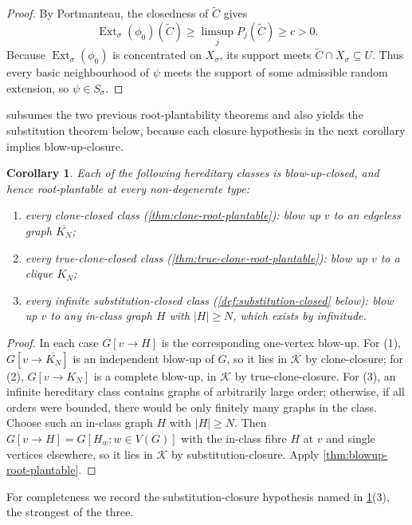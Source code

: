 \documentclass[11pt]{article}
\newtheorem{corollary}[corollary]{Corollary}
\theoremstyle{definition}
\newcommand{\K}{\mathcal{K}}
\newcommand{\Ext}{\operatorname{Ext}}
\begin{document}
\begin{proof}
By Portmanteau, the closedness of $\widetilde C$ gives
\[
  \Ext_\sigma(\phi_0)(\widetilde C)\ge\limsup_j P_j(\widetilde C)\ge c>0.
\]
Because $\Ext_\sigma(\phi_0)$ is concentrated on $X_\sigma$, its support meets
$\widetilde C\cap X_\sigma\subseteq U$.  Thus every basic neighbourhood of $\psi$ meets
the support of some admissible random extension, so $\psi\in S_\sigma$.
\end{proof}

 subsumes the two previous root-plantability theorems and
also yields the substitution theorem below, because each closure hypothesis in the next
corollary implies blow-up-closure.

\begin{corollary}\label{cor:closures-imply-blowup}
Each of the following hereditary classes is blow-up-closed, and hence root-plantable at
every non-degenerate type:
\begin{enumerate}
\item every clone-closed class (\cref{thm:clone-root-plantable}): blow up $v$ to an
  edgeless graph $\overline{K_N}$;
\item every true-clone-closed class (\cref{thm:true-clone-root-plantable}): blow up $v$
  to a clique $K_N$;
\item every infinite substitution-closed class (\cref{def:substitution-closed} below):
  blow up $v$ to any in-class graph $H$ with $|H|\ge N$, which exists by infinitude.
\end{enumerate}
\end{corollary}

\begin{proof}
In each case $G[v\to H]$ is the corresponding one-vertex blow-up.  For (1),
$G[v\to\overline{K_N}]$ is an independent blow-up of $G$, so it lies in $\K$ by
clone-closure; for (2), $G[v\to K_N]$ is a complete blow-up, in $\K$ by
true-clone-closure.  For (3), an infinite hereditary class contains graphs of arbitrarily
large order; otherwise, if all orders were bounded, there would be only finitely many
graphs in the class.  Choose such an in-class graph $H$ with $|H|\ge N$.  Then
$G[v\to H]=G[H_w:w\in V(G)]$ with the in-class fibre $H$ at $v$ and single vertices
elsewhere, so it lies in $\K$ by substitution-closure.  Apply
\cref{thm:blowup-root-plantable}.
\end{proof}

For completeness we record the substitution-closure hypothesis named in
\cref{cor:closures-imply-blowup}(3), the strongest of the three.
\end{document}
